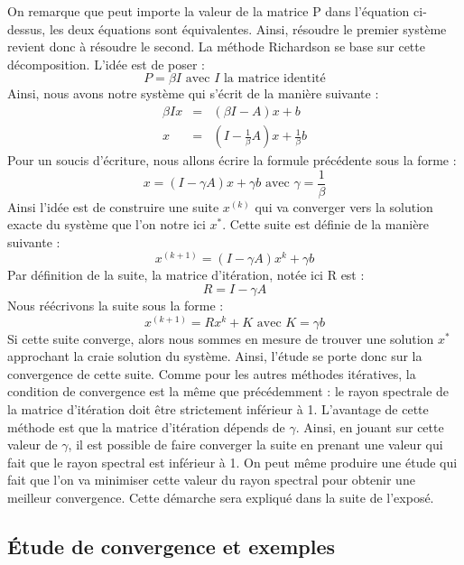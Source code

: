 On remarque que peut importe la valeur de la matrice P dans l'équation ci-dessus, les deux équations sont équivalentes. Ainsi, résoudre le premier système revient donc à résoudre le second. La méthode Richardson se base sur cette décomposition. L'idée est de poser : 
\begin{equation}
	P = \beta I \text{ avec $I$ la matrice identité}
\end{equation}
Ainsi, nous avons notre système qui s'écrit de la manière suivante : 
\begin{eqnarray}
\beta Ix &=& (\beta I - A)x + b\\
x &=& (I - \frac{1}{\beta} A)x + \frac{1}{\beta}b
\end{eqnarray}
Pour un soucis d'écriture, nous allons écrire la formule précédente sous la forme : 
\begin{equation}
x = (I - \gamma A)x + \gamma b \text{ avec $\gamma = \frac{1}{\beta}$}
\end{equation}
Ainsi l'idée est de construire une suite $x^{(k)}$ qui va converger vers la solution exacte du système que l'on notre ici $x^*$. Cette suite est définie de la manière suivante : 
\begin{equation}
x^{(k+1)} = (I - \gamma A)x^{k} + \gamma b
\end{equation}
Par définition de la suite, la matrice d'itération, notée ici R est : 
\begin{equation}
R = I - \gamma A
\end{equation}
Nous réécrivons la suite sous la forme : 
\begin{equation}
x^{(k+1)} = Rx^{k} + K \text{ avec $K = \gamma b$}
\end{equation}
Si cette suite converge, alors nous sommes en mesure de trouver une solution $x^*$ approchant la craie solution du système. Ainsi, l'étude se porte donc sur la convergence de cette suite. Comme pour les autres méthodes itératives, la condition de convergence est la même que précédemment : le rayon spectrale de la matrice d'itération doit être strictement inférieur à 1. L'avantage de cette méthode est que la matrice d'itération dépends de $\gamma$. Ainsi, en jouant sur cette valeur de $\gamma$, il est possible de faire converger la suite en prenant une valeur qui fait que le rayon spectral est inférieur à 1. On peut même produire une étude qui fait que l'on va minimiser cette valeur du rayon spectral pour obtenir une meilleur convergence. Cette démarche sera expliqué dans la suite de l'exposé.
 
\subsection{Étude de convergence et exemples}
